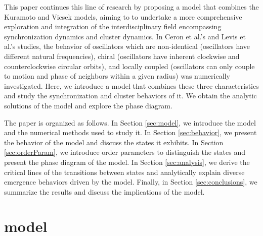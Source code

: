 \documentclass[%
 aip,
 amsmath,amssymb,
 reprint,%
]{revtex4-1}
\begin{document}
This paper continues this line of research by proposing a model that combines the Kuramoto and Vicsek models, aiming to to undertake a more comprehensive exploration and integration of the interdisciplinary field encompassing synchronization dynamics and cluster dynamics. In Ceron et al.'s \cite{ceron2023diverse} and Levis et al.'s \cite{levis2019activity} studies, the behavior of oscillators which are non-identical (oscillators have different natural frequencies), chiral
(oscillators have inherent clockwise and counterclockwise circular orbits), and locally coupled (oscillators can only couple to motion and phase of neighbors within a given radius) was numerically investigated. Here, we introduce a model that combines these three characteristics and study the synchronization and cluster behaviors of it. We obtain the analytic solutions of the model and explore the phase diagram. 

The paper is organized as follows. In Section \ref{sec:model}, we introduce the model and the numerical methods used to study it. In Section \ref{sec:behavior}, we present the behavior of the model and discuss the states it exhibits. In Section \ref{sec:orderParam}, we introduce order parameters to distinguish the states and present the phase diagram of the model. In Section \ref{sec:analysis}, we derive the critical lines of the transitions between states and analytically explain diverse emergence behaviors driven by the model. Finally, in Section \ref{sec:conclusions}, we summarize the results and discuss the implications of the model.

\section{\label{sec:model} model}
\end{document}
